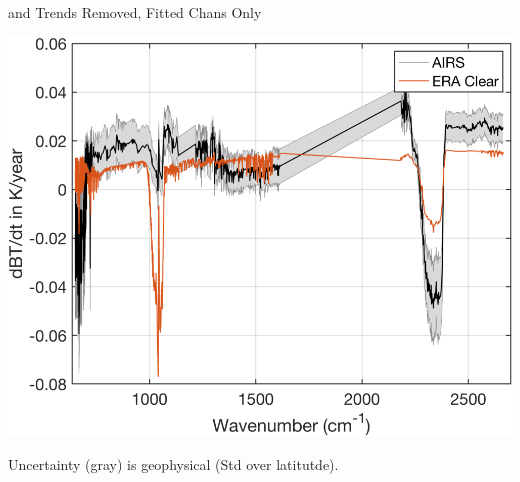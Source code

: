 \documentclass[10pt,t]{beamer}
\begin{document}
\begin{frame}[label={sec:org68d5d19}]{\cd and \methane Trends Removed, Fitted Chans Only}
\begin{center}
\includegraphics[width=0.75\linewidth]{./Figs/Png/rand_global_trend_l1c_vs_era_clr_only_fit_chans.png}
\end{center}

Uncertainty (gray) is geophysical (Std over latitutde).
\end{frame}
\end{document}
